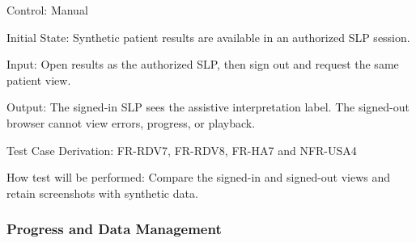\documentclass[12pt, titlepage]{article}
\begin{document}
\begin{enumerate}
Control: Manual

Initial State: Synthetic patient results are available in an authorized SLP session.

Input: Open results as the authorized SLP, then sign out and request the same patient view.

Output: The signed-in SLP sees the assistive interpretation label. The signed-out browser cannot view errors, progress, or playback.

Test Case Derivation: FR-RDV7, FR-RDV8, FR-HA7 and NFR-USA4

How test will be performed: Compare the signed-in and signed-out views and retain screenshots with synthetic data.

\end{enumerate}

\subsubsection{Progress and Data Management}
\end{document}
